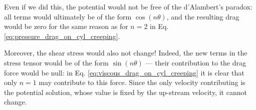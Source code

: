 Even if we did this, the potential would not be free of the
d'Alambert's paradox: all terms would ultimately be of the form
$\cos(n\theta)$, and the resulting drag would be zero for the same
reason as for $n=2$ in Eq. \ref{eq:pressure_drag_on_cyl_creeping}.

Moreover, the shear stress would also not change! Indeed, the new
terms in the stress tensor would be of the form $\sin(n\theta)$ ---
their contribution to the drag force would be null: in Eq.
\ref{eq:viscous_drag_on_cyl_creeping} it is clear that only $n=1$ may
contribute to this force. Since the only velocity contributing is the
potential solution, whose value is fixed by the up-stream velocity, it
cannot change.
